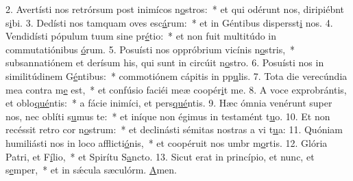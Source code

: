 2. Avertísti nos retrórsum post inimícos n\uline{o}stros:~* et qui odérunt nos, diripiébnt s\uline{i}bi.
3. Dedísti nos tamquam oves esc\uline{á}rum:~* et in Géntibus dispersst\uline{i} nos.
4. Vendidísti pópulum tuum sine pr\uline{é}tio:~* et non fuit multitúdo in commutatiónibus \uline{ó}rum.
5. Posuísti nos oppróbrium vicínis n\uline{o}stris,~* subsannatiónem et derísum his, qui sunt in circúit n\uline{o}stro.
6. Posuísti nos in similitúdinem G\uline{é}ntibus:~* commotiónem cápitis in pp\uline{u}lis.
7. Tota die verecúndia mea contra m\uline{e} est,~* et confúsio faciéi meæ coopér\uline{i}t me.
8. A voce exprobrántis, et oblo\uline{qué}ntis:~* a fácie inimíci, et pers\uline{qué}ntis.
9. Hæc ómnia venérunt super nos, nec oblíti s\uline{u}mus te:~* et iníque non égimus in testamént t\uline{u}o.
10. Et non recéssit retro cor n\uline{o}strum:~* et declinásti sémitas nostras a vi t\uline{u}a:
11. Quóniam humiliásti nos in loco afflicti\uline{ó}nis,~* et coopéruit nos umbr m\uline{o}rtis.
12. Glória Patri, et F\uline{í}lio,~* et Spirítu S\uline{a}ncto.
13. Sicut erat in princípio, et nunc, et s\uline{e}mper,~* et in sǽcula sæculórm. \uline{A}men.
